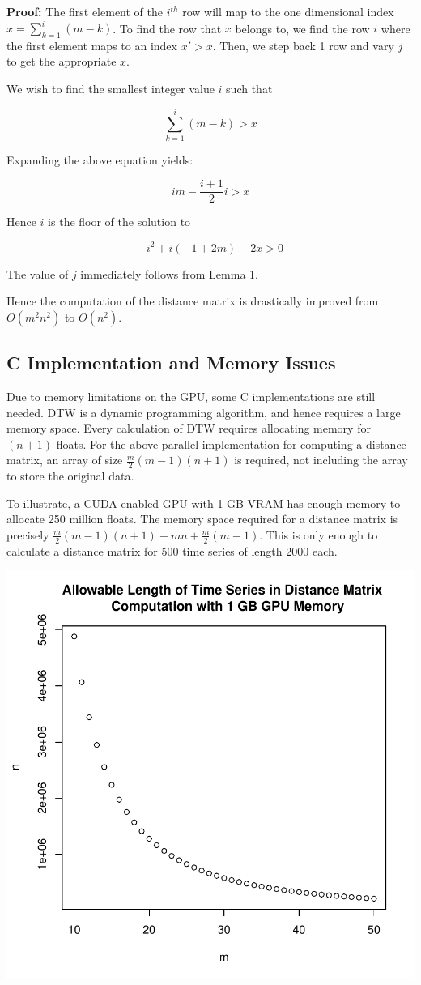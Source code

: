 \documentclass{article}
\begin{document}
\textbf{Proof:} The first element of the $i^{th}$ row will map to the 
one dimensional index $x = \sum_{k=1}^i (m-k)$.  To find the row that $x$
belongs to, we find the row $i$ where the first element maps to an index $x' > x$.
Then, we step back 1 row and vary $j$ to get the appropriate $x$.  

We wish to find the smallest integer value $i$ such that 

$$\sum_{k=1}^i (m - k) > x$$

Expanding the above equation yields:

$$im - \frac{i+1}{2}i > x$$

Hence $i$ is the floor of the solution to 

$$-i^2 + i(-1 + 2m) - 2x > 0$$

The value of $j$ immediately follows from Lemma 1.

Hence the computation of the distance matrix is drastically improved
from $O(m^2n^2)$ to $O(n^2)$.

\subsection{C Implementation and Memory Issues}

Due to memory limitations on the GPU, some C implementations are still needed. 
DTW is a dynamic programming algorithm, and hence requires a large memory space.
Every calculation of DTW requires allocating memory for $(n+1)$ floats.  
For the above parallel implementation for computing a distance matrix, 
an array of size $\frac{m}{2}(m-1)(n+1)$ is required, not including the array
to store the original data. 

To illustrate, a CUDA enabled GPU with 1 GB VRAM has enough memory to allocate
250 million floats.  The memory space required for a distance matrix is precisely 
$\frac{m}{2}(m-1)(n+1) + mn + \frac{m}{2}(m-1)$.  This is only enough to calculate
a distance matrix for 500 time series of length 2000 each.

\includegraphics{tsclust-006}
\end{document}

